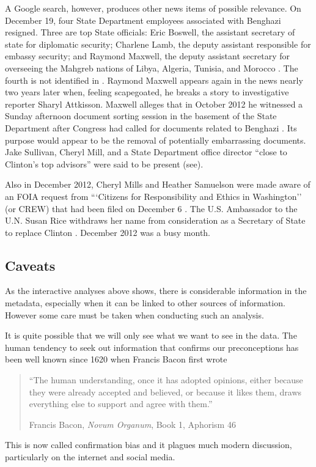 \documentclass[journal]{vgtc}                %
\begin{document}
A Google search,  however, produces other news items of possible relevance.  On  December 19, four State Department employees associated with Benghazi resigned.  Three are top State officials: Eric Boswell,  the assistant secretary of state for diplomatic security;  Charlene Lamb, the deputy assistant responsible for embassy security; and Raymond Maxwell, the deputy assistant secretary for overseeing the Mahgreb nations of Libya, Algeria, Tunisia, and Morocco \cite{securityResigns, fourResign, tripoliPostResign}.  The fourth is not identified in \cite{fourResign, tripoliPostResign}.   Raymond Maxwell appears again in the news nearly two years later when, feeling scapegoated, he breaks a story to investigative reporter Sharyl Attkisson.  Maxwell alleges that in October 2012 he witnessed a Sunday afternoon document sorting session in the basement of the State Department after Congress had called for documents related to Benghazi \cite{AttkissonBenghaziBombshell, attkissonTimeline}.  Its purpose would appear to be the removal of potentially embarrassing documents.  Jake Sullivan,  Cheryl Mill, and a State Department office director ``close to Clinton's top advisors''  were said to be present (see\cite{AttkissonBenghaziBombshell}).

Also in December 2012, Cheryl Mills and Heather Samuelson were made aware of an FOIA request from ```Citizens for Responsibility and Ethics in Washington'' (or CREW) that had been filed on December 6 \cite{CREWFOIA, FOIAcall}.   The U.S. Ambassador to the U.N. Susan Rice withdraws her name from consideration as a Secretary of State to replace Clinton \cite{RiceWithdraws}.  December 2012 was a busy month.

\subsection{Caveats}
\label{sect:caveats}
As the interactive analyses above shows, there is considerable information in the metadata, especially when it can be linked to other sources of information.  However some care must be taken when conducting such an analysis.  

It is quite possible that we will only see what we want to see in the data.  The human tendency to seek out information that confirms our preconceptions has been well known since 1620 when Francis Bacon first wrote 
\begin{quotation}
``The human understanding, once it has adopted opinions, either because they were already accepted and believed, or because it likes them, draws everything else to support and agree with them.''

\noindent
Francis Bacon, \emph{Novum Organum}, Book 1, Aphorism 46 \cite{Bacon1620}

\end{quotation}
This is now called confirmation bias \cite{confBias} and it plagues much modern discussion, particularly on the internet and social media.  
\end{document}
